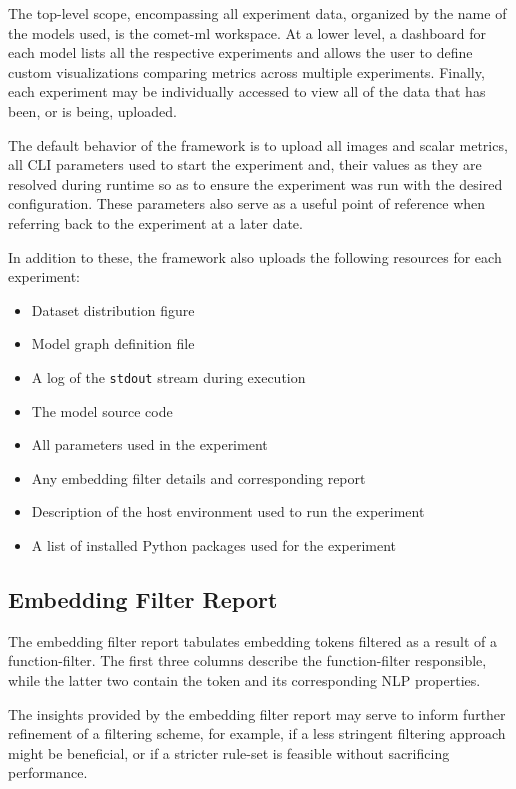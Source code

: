 \documentclass[../../fyp.tex]{subfiles}
\begin{document}
 \label{sec:comet_ml_integration}
The top-level scope, encompassing all experiment data, organized by the name of the models used, is the comet-ml workspace. At a lower level, a dashboard for each model lists all the respective experiments and allows the user to define custom visualizations comparing metrics across multiple experiments. Finally, each experiment may be individually accessed to view all of the data that has been, or is being, uploaded.

The default behavior of the framework is to upload all images and scalar metrics, all CLI parameters used to start the experiment and, their values as they are resolved during runtime so as to ensure the experiment was run with the desired configuration. These parameters also serve as a useful point of reference when referring back to the experiment at a later date. 

In addition to these, the framework also uploads the following resources for each experiment:
\begin{itemize}
\item Dataset distribution figure
\item Model graph definition file
\item A log of the \texttt{stdout} stream during execution
\item The model source code
\item All parameters used in the experiment
\item Any embedding filter details and corresponding report
\item Description of the host environment used to run the experiment 
\item A list of installed Python packages used for the experiment
\end{itemize}

\subsection{Embedding Filter Report}
The embedding filter report tabulates embedding tokens filtered as a result of a function-filter. The first three columns describe the function-filter responsible, while the latter two contain the token and its corresponding NLP properties. 

The insights provided by the embedding filter report may serve to inform further refinement of a filtering scheme, for example, if a less stringent filtering approach might be beneficial, or if a stricter rule-set is feasible without sacrificing performance. 
\end{document}
